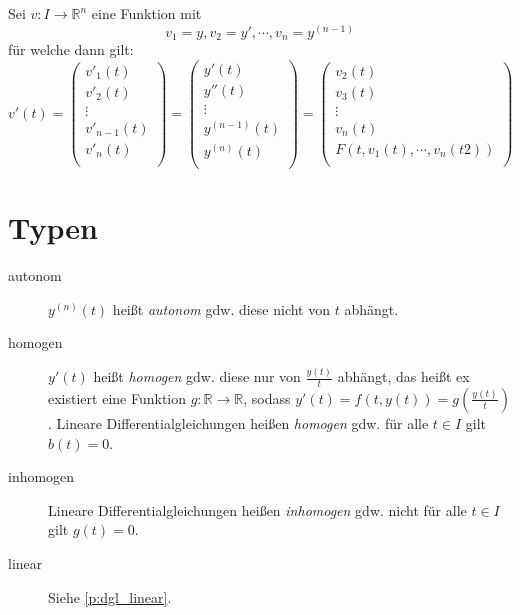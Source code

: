         Sei $ v : I \rightarrow \mathbb{R} ^ n $ eine Funktion mit \[ v _ 1 = y, v _ 2 = y', \cdots, v _ n = y ^ {( n - 1 )} \] für welche dann gilt:
        \begin{equation*}
            v'(t) =
            \begin{pmatrix}
                v' _ 1 (t) \\
                v' _ 2 (t) \\
                \vdots \\
                v' _ { n - 1 } (t) \\
                v' _ n (t) \\
            \end{pmatrix}
            =
            \begin{pmatrix}
                y'(t) \\
                y''(t) \\
                \vdots \\
                y ^ {(n - 1)} (t) \\
                y ^ {(n)} (t) \\
            \end{pmatrix}
            =
            \begin{pmatrix}
                v _ 2 (t) \\
                v _ 3 (t) \\
                \vdots \\
                v _ n (t) \\
                F(t, v _ 1 (t), \cdots, v _ n (t2)) \\
            \end{pmatrix}
        \end{equation*}


    \section{Typen}
        \begin{description}
            \item[autonom] $ y ^ {(n)} (t) $ heißt \textit{autonom} gdw. diese nicht von $ t $ abhängt.
            \item[homogen] $ y'(t) $ heißt \textit{homogen} gdw. diese nur von $ \frac{y(t)}{t} $ abhängt, das heißt ex existiert eine Funktion $ g : \mathbb{R} \rightarrow \mathbb{R} $, sodass $ y'(t) = f(t, y(t)) = g(\frac{y(t)}{t}) $. Lineare Differentialgleichungen heißen \textit{homogen} gdw. für alle $ t \in I $ gilt $ b(t) = 0 $.
            \item[inhomogen] Lineare Differentialgleichungen heißen \textit{inhomogen} gdw. nicht für alle $ t \in I $ gilt $ g(t) = 0 $.
            \item[linear] Siehe \ref{p:dgl_linear}.
        \end{description}

